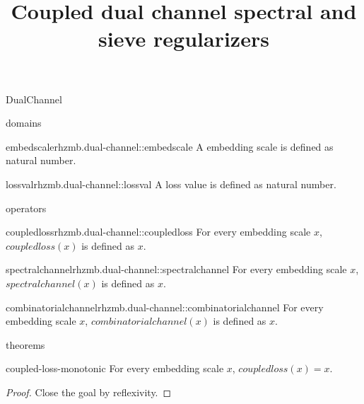 \begin{lexlean}{DualChannel}
\title{Coupled dual channel spectral and sieve regularizers}

\begin{section}{domains}
  \begin{typedefinition}{embedscale}{rhzmb.dual-channel::embedscale}
  \noaxioms
  A embedding scale is defined as natural number.
  \end{typedefinition}

  \begin{typedefinition}{lossval}{rhzmb.dual-channel::lossval}
  \noaxioms
  A loss value is defined as natural number.
  \end{typedefinition}
\end{section}

\begin{section}{operators}
  \begin{termdefinition}{coupledloss}{rhzmb.dual-channel::coupledloss}
  \noaxioms
  For every embedding scale \(x\), \(coupledloss(x)\) is defined as \(x\).
  \end{termdefinition}

  \begin{termdefinition}{spectralchannel}{rhzmb.dual-channel::spectralchannel}
  \noaxioms
  For every embedding scale \(x\), \(spectralchannel(x)\) is defined as \(x\).
  \end{termdefinition}

  \begin{termdefinition}{combinatorialchannel}{rhzmb.dual-channel::combinatorialchannel}
  \noaxioms
  For every embedding scale \(x\), \(combinatorialchannel(x)\) is defined as \(x\).
  \end{termdefinition}
\end{section}

\begin{section}{theorems}
  \begin{theorem}{coupled-loss-monotonic}
  \noaxioms
  For every embedding scale \(x\), \(coupledloss(x) = x\).
  \begin{proof}
  Close the goal by reflexivity.
  \end{proof}
  \end{theorem}


\end{section}
\end{lexlean}
